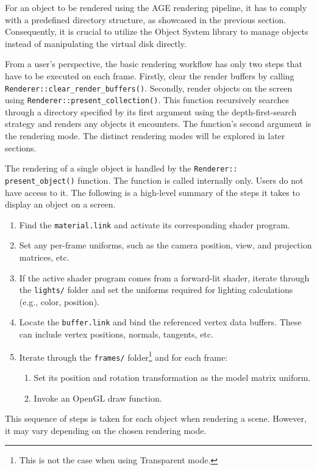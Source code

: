 \documentclass[
  digital,     %
  oneside,     %
  nosansbold,  %
  nocolorbold, %
  lof,         %
  lot,         %
]{fithesis4}
\begin{document}
For an object to be rendered using the AGE rendering pipeline, it has to comply with a predefined
directory structure, as showcased in the previous section. Consequently, it is crucial to utilize
the Object System library to manage objects instead of manipulating the virtual disk directly.

From a user's perspective, the basic rendering workflow has only two steps that have to be executed on each frame.
Firstly, clear the render buffers by calling \verb|Renderer::clear_render_buffers()|. Secondly, render objects
on the screen using \verb|Renderer::present_collection()|. This function recursively searches through a directory
specified by its first argument using the depth-first-search strategy and renders any objects it encounters.
The function's second argument is the rendering mode. The distinct rendering modes will be explored
in later sections.

The rendering of a single object is handled by the \verb|Renderer::|\\
\verb|present_object()| function.
The function is called internally only. Users do not have access to it.
The following is a high-level summary of the steps it takes to display an object on a screen.
\begin{enumerate}
    \item Find the \verb|material.link| and activate its corresponding shader program.
    
    \item Set any per-frame uniforms, such as the camera position,
    view, and projection matrices, etc.

    \item If the active shader program comes from a forward-lit shader, iterate through the \verb|lights/| folder
    and set the uniforms required for lighting calculations (e.g., color, position).

    \item Locate the \verb|buffer.link| and bind the referenced vertex data buffers. These
    can include vertex positions, normals, tangents, etc.

    \item Iterate through the \verb|frames/| folder\footnote{This is not the case when using Transparent mode.}
    and for each frame:

    \begin{enumerate}
        \item[5.1.] Set its position and rotation transformation as the model matrix uniform.
        
        \item[5.2.] Invoke an OpenGL draw function.
    \end{enumerate}
\end{enumerate}
This sequence of steps is taken for each object when rendering a scene. However, it may vary depending
on the chosen rendering mode.
\end{document}
